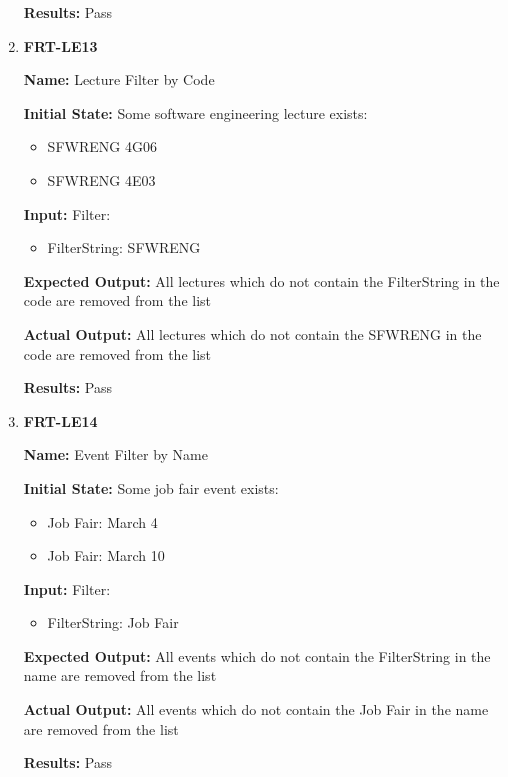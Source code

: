 \documentclass[12pt, titlepage]{article}
\begin{document}
\begin{enumerate}
\textbf{Results:} Pass

\item \textbf{FRT-LE13}

\textbf{Name:} Lecture Filter by Code

\textbf{Initial State:} Some software engineering lecture exists:
\begin{itemize}
\item SFWRENG 4G06
\item SFWRENG 4E03
\end{itemize}

\textbf{Input:} Filter:
\begin{itemize}
\item FilterString: SFWRENG
\end{itemize}
					
\textbf{Expected Output:} All lectures which do not contain the FilterString in the code are removed from the list

\textbf{Actual Output:} All lectures which do not contain the SFWRENG in the code are removed from the list

\textbf{Results:} Pass

\item \textbf{FRT-LE14}

\textbf{Name:} Event Filter by Name

\textbf{Initial State:} Some job fair event exists:
\begin{itemize}
\item Job Fair: March 4
\item Job Fair: March 10
\end{itemize}

\textbf{Input:} Filter:
\begin{itemize}
\item FilterString: Job Fair
\end{itemize}
					
\textbf{Expected Output:} All events which do not contain the FilterString in the name are removed from the list

\textbf{Actual Output:} All events which do not contain the Job Fair in the name are removed from the list

\textbf{Results:} Pass
\end{enumerate}
\end{document}
